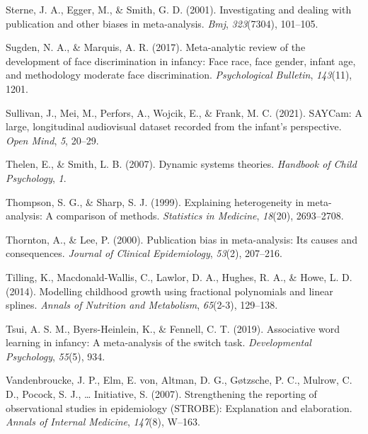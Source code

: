 \documentclass[
  man]{apa6}
\newlength{\cslhangindent}
\newlength{\cslentryspacingunit} %
\newenvironment{CSLReferences}[2] %
 {%
  \setlength{\parindent}{0pt}
  \ifodd #1
  \let\oldpar\par
  \def\par{\hangindent=\cslhangindent\oldpar}
  \fi
  \setlength{\parskip}{#2\cslentryspacingunit}
 }%
 {}
\begin{document}
\begin{CSLReferences}{1}{0}
\leavevmode{}%
Sterne, J. A., Egger, M., \& Smith, G. D. (2001). Investigating and dealing with publication and other biases in meta-analysis. \emph{Bmj}, \emph{323}(7304), 101--105.

\leavevmode{}%
Sugden, N. A., \& Marquis, A. R. (2017). Meta-analytic review of the development of face discrimination in infancy: Face race, face gender, infant age, and methodology moderate face discrimination. \emph{Psychological Bulletin}, \emph{143}(11), 1201.

\leavevmode{}%
Sullivan, J., Mei, M., Perfors, A., Wojcik, E., \& Frank, M. C. (2021). SAYCam: A large, longitudinal audiovisual dataset recorded from the infant's perspective. \emph{Open Mind}, \emph{5}, 20--29.

\leavevmode{}%
Thelen, E., \& Smith, L. B. (2007). Dynamic systems theories. \emph{Handbook of Child Psychology}, \emph{1}.

\leavevmode{}%
Thompson, S. G., \& Sharp, S. J. (1999). Explaining heterogeneity in meta-analysis: A comparison of methods. \emph{Statistics in Medicine}, \emph{18}(20), 2693--2708.

\leavevmode{}%
Thornton, A., \& Lee, P. (2000). Publication bias in meta-analysis: Its causes and consequences. \emph{Journal of Clinical Epidemiology}, \emph{53}(2), 207--216.

\leavevmode{}%
Tilling, K., Macdonald-Wallis, C., Lawlor, D. A., Hughes, R. A., \& Howe, L. D. (2014). Modelling childhood growth using fractional polynomials and linear splines. \emph{Annals of Nutrition and Metabolism}, \emph{65}(2-3), 129--138.

\leavevmode{}%
Tsui, A. S. M., Byers-Heinlein, K., \& Fennell, C. T. (2019). Associative word learning in infancy: A meta-analysis of the switch task. \emph{Developmental Psychology}, \emph{55}(5), 934.

\leavevmode{}%
Vandenbroucke, J. P., Elm, E. von, Altman, D. G., Gøtzsche, P. C., Mulrow, C. D., Pocock, S. J., \ldots{} Initiative, S. (2007). Strengthening the reporting of observational studies in epidemiology (STROBE): Explanation and elaboration. \emph{Annals of Internal Medicine}, \emph{147}(8), W--163.


\end{CSLReferences}
\end{document}
